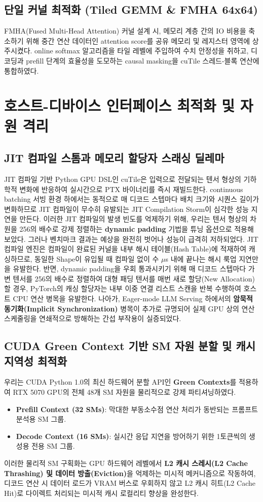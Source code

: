 \documentclass[preprint]{kcc} %
\begin{document}
\subsection{단일 커널 최적화 (Tiled GEMM \& FMHA 64x64)}
FMHA(Fused Multi-Head Attention) 커널 설계 시, 메모리 계층 간의 IO 비용을 축소하기 위해 중간 연산 데이터인 attention score를 공유 메모리 및 레지스터 영역에 상주시켰다. online softmax 알고리즘을 타일 레벨에 주입하여 수치 안정성을 취하고, 디코딩과 prefill 단계의 효율성을 도모하는 causal masking을 cuTile 스레드-블록 연산에 통합하였다.


\section{호스트-디바이스 인터페이스 최적화 및 자원 격리}
\subsection{JIT 컴파일 스톰과 메모리 할당자 스래싱 딜레마}
JIT 컴파일 기반 Python GPU DSL인 cuTile은 입력으로 전달되는 텐서 형상의 기하학적 변화에 반응하여 실시간으로 PTX 바이너리를 즉시 재빌드한다. continuous batching 서빙 환경 하에서는 동적으로 매 디코드 스텝마다 배치 크기와 시퀀스 길이가 변화하므로 JIT 컴파일이 무수히 유발되는 JIT Compilation Storm이 심각한 성능 지연을 만든다.
이러한 JIT 컴파일의 발생 빈도를 억제하기 위해, 우리는 텐서 형상의 차원을 256의 배수로 강제 정렬하는 \textbf{dynamic padding} 기법을 튜닝 옵션으로 적용해 보았다. 그러나 벤치마크 결과는 예상을 완전히 벗어나 성능이 급격히 저하되었다.
JIT 컴파일 엔진은 컴파일이 완료된 커널을 내부 해시 테이블(Hash Table)에 적재하여 캐싱하므로, 동일한 Shape이 유입될 때 컴파일 없이 수 $\mu$s 내에 끝나는 해시 룩업 지연만을 유발한다. 반면, dynamic padding을 우회 통과시키기 위해 매 디코드 스텝마다 가변 텐서를 256의 배수로 정렬하여 대형 패딩 텐서를 매번 새로 할당(New Allocation)할 경우, PyTorch의 캐싱 할당자는 내부 이중 연결 리스트 스캔을 반복 수행하여 호스트 CPU 연산 병목을 유발한다. 나아가, Eager-mode LLM Serving 하에서의 \textbf{암묵적 동기화(Implicit Synchronization)} 병목이 추가로 규명되어 실제 GPU 상의 연산 스케줄링을 연쇄적으로 방해하는 간섭 부작용이 실증되었다.

\subsection{CUDA Green Context 기반 SM 자원 분할 및 캐시 지역성 최적화}
우리는 CUDA Python 1.0의 최신 하드웨어 분할 API인 \textbf{Green Contexts}를 적용하여 RTX 5070 GPU의 전체 48개 SM 자원을 물리적으로 강제 파티셔닝하였다.
\begin{itemize}
    \item \textbf{Prefill Context (32 SMs)}: 막대한 부동소수점 연산 처리가 동반되는 프롬프트 분석용 SM 그룹.
    \item \textbf{Decode Context (16 SMs)}: 실시간 응답 지연을 방어하기 위한 1토큰씩의 생성용 전용 SM 그룹.
\end{itemize}
이러한 물리적 SM 구획화는 GPU 하드웨어 레벨에서 \textbf{L2 캐시 스레시(L2 Cache Thrashing) 및 데이터 방출(Eviction)}을 억제하는 미시적 메커니즘으로 작동하여, 디코드 연산 시 데이터 로드가 VRAM 버스로 우회하지 않고 L2 캐시 히트(L2 Cache Hit)로 다이렉트 처리되는 미시적 캐시 로컬리티 향상을 완성한다.
\end{document}
